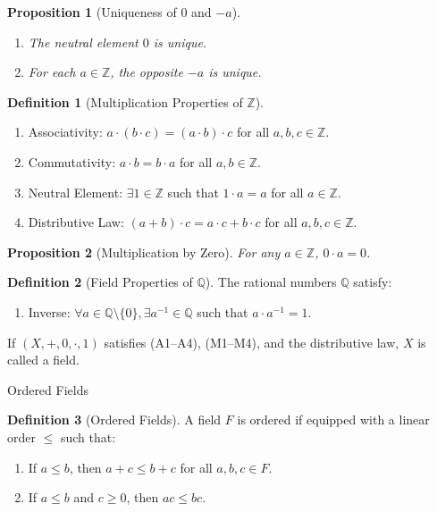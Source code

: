 \documentclass[7pt]{article}
\theoremstyle{definition}
\newtheorem{definition}{Definition}
\theoremstyle{plain}
\newtheorem{proposition}{Proposition}
\begin{document}
\begin{proposition}[Uniqueness of $ 0 $ and $ -a $]
\begin{enumerate}
    \item The neutral element $ 0 $ is unique.
    \item For each $ a \in \mathbb{Z} $, the opposite $ -a $ is unique.
\end{enumerate}
\end{proposition}

\begin{definition}[Multiplication Properties of $ \mathbb{Z} $]

\begin{enumerate}[label=(M\arabic*)]
    \item {Associativity:} $ a \cdot (b \cdot c) = (a \cdot b) \cdot c $ for all $ a, b, c \in \mathbb{Z} $.
    \item {Commutativity:} $ a \cdot b = b \cdot a $ for all $ a, b \in \mathbb{Z} $.
    \item {Neutral Element:} $ \exists 1 \in \mathbb{Z} $ such that $ 1 \cdot a = a $ for all $ a \in \mathbb{Z} $.
    \item {Distributive Law:} $ (a + b) \cdot c = a \cdot c + b \cdot c $ for all $ a, b, c \in \mathbb{Z} $.
\end{enumerate}
\end{definition}

\begin{proposition}[Multiplication by Zero]
For any $ a \in \mathbb{Z} $, $ 0 \cdot a = 0 $.
\end{proposition}

\begin{definition}[Field Properties of $ \mathbb{Q} $]
The rational numbers $ \mathbb{Q} $ satisfy:
\begin{enumerate}[label=(M\arabic*), resume]
    \item {Inverse:} $ \forall a \in \mathbb{Q} \setminus \{0\}, \exists a^{-1} \in \mathbb{Q} $ such that $ a \cdot a^{-1} = 1 $.
\end{enumerate}
If $ (X, +, 0, \cdot, 1) $ satisfies (A1–A4), (M1–M4), and the distributive law, $ X $ is called a field.
\end{definition}

{Ordered Fields}
\begin{definition}[Ordered Fields]
A field $ F $ is ordered if equipped with a linear order $ \leq $ such that:
\begin{enumerate}[label=(O\arabic*)]
    \item If $ a \leq b $, then $ a + c \leq b + c $ for all $ a, b, c \in F $.
    \item If $ a \leq b $ and $ c \geq 0 $, then $ ac \leq bc $.
\end{enumerate}
\end{definition}
\end{document}
